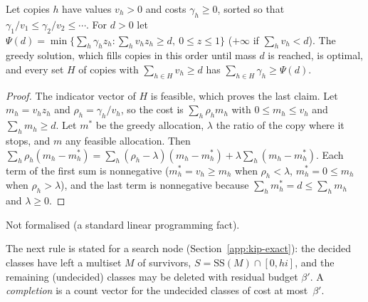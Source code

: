 \begin{lemma}\label{lem:fractional}
Let copies $h$ have values $v_h>0$ and costs $\gamma_h\ge 0$, sorted so that
$\gamma_1/v_1\le\gamma_2/v_2\le\cdots$. For $d>0$ let
$\Psi(d)=\min\{\sum_h\gamma_h z_h:\sum_h v_hz_h\ge d,\ 0\le z\le 1\}$ ($+\infty$
if $\sum_h v_h<d$). The greedy solution, which fills copies in this order
until mass $d$ is reached, is optimal, and every set $H$ of copies with
$\sum_{h\in H}v_h\ge d$ has $\sum_{h\in H}\gamma_h\ge\Psi(d)$.
\end{lemma}
\begin{proof}
The indicator vector of $H$ is feasible, which proves the last claim. Let
$m_h=v_hz_h$ and $\rho_h=\gamma_h/v_h$, so the cost is $\sum_h\rho_hm_h$ with
$0\le m_h\le v_h$ and $\sum_h m_h\ge d$. Let $m^{*}$ be the greedy allocation,
$\lambda$ the ratio of the copy where it stops, and $m$ any feasible
allocation. Then
$\sum_h\rho_h(m_h-m^{*}_h)=\sum_h(\rho_h-\lambda)(m_h-m^{*}_h)+\lambda\sum_h(m_h-m^{*}_h)$.
Each term of the first sum is nonnegative ($m^{*}_h=v_h\ge m_h$ when
$\rho_h<\lambda$, $m^{*}_h=0\le m_h$ when $\rho_h>\lambda$), and the last term is
nonnegative because $\sum_hm^{*}_h=d\le\sum_hm_h$ and $\lambda\ge 0$.
\end{proof}
\noindent Not formalised (a standard linear programming fact).

The next rule is stated for a search node (Section~\ref{app:kip-exact}): the
decided classes have left a multiset $M$ of survivors, $S=\mathrm{SS}(M)\cap[0,hi]$,
and the remaining (undecided) classes may be deleted with residual budget
$\beta'$. A \emph{completion} is a count vector for the undecided classes of
cost at most~$\beta'$.


